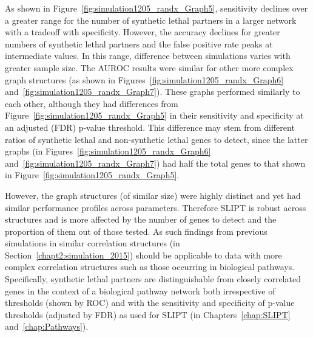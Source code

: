 As shown in Figure~\ref{fig:simulation1205_randx_Graph5}, sensitivity declines over a greater range for the number of \gls{synthetic lethal} partners in a larger network with a tradeoff with specificity. However,  the accuracy declines for greater numbers of \gls{synthetic lethal} partners and the false positive rate peaks at intermediate values. In this range, difference between simulations varies with greater sample size. The \gls{AUROC} results were similar for other more complex \gls{graph} structures (as shown in Figures~\ref{fig:simulation1205_randx_Graph6} and~\ref{fig:simulation1205_randx_Graph7}). These \glspl{graph} performed similarly to each other, although they had differences from Figure~\ref{fig:simulation1205_randx_Graph5} in their sensitivity and specificity at an adjusted (\gls{FDR}) p-value threshold. This difference may stem from different ratios of \gls{synthetic lethal} and non-synthetic lethal genes to detect, since the latter \glspl{graph} (in Figures~\ref{fig:simulation1205_randx_Graph6} and~\ref{fig:simulation1205_randx_Graph7}) had half the total genes to that shown in Figure~\ref{fig:simulation1205_randx_Graph5}.

However, the \gls{graph} structures (of similar size) were highly distinct and yet had similar performance profiles across parameters. Therefore \gls{SLIPT} is robust across  structures and is more affected by the number of genes to detect and the proportion of them out of those tested. As such findings from previous simulations in similar correlation structures (in Section~\ref{chapt2:simulation_2015}) should be applicable to  data with more complex correlation structures such as those occurring in biological pathways. Specifically, \gls{synthetic lethal} partners are distinguishable from closely correlated genes in the context of a biological pathway network both irrespective of thresholds (shown by \gls{ROC}) and with the sensitivity and specificity of p-value thresholds (adjusted by \gls{FDR}) as used for \gls{SLIPT} (in Chapters~\ref{chap:SLIPT} and~\ref{chap:Pathways}).



